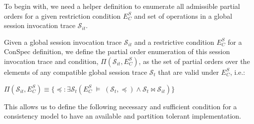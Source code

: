 \documentclass[conference]{IEEEtran}
\begin{document}
	
	
	
	To begin with, we need a helper definition to enumerate all admissible partial orders for a given restriction condition $E^S_C$ and set of operations in a global session invocation trace $\mathcal{S}_{it}$.
	
	\begin{definition} \label{def:allpos}
		Given a global session invocation trace $\mathcal{S}_{it}$ and a restrictive condition $E^S_C$
		for a ConSpec definition, we define the partial order enumeration
		of this session invocation trace and condition, $\Pi(\mathcal{S}_{it},E^S_C)$, as
		the set of partial orders over the elements of any compatible global session trace $\mathcal{S}_{t}$ that are valid
		under $E^S_C$, i.e.:
		
		
		$\Pi(\mathcal{S}_{it},E^S_C) \equiv  \{\preccurlyeq: \exists \mathcal{S}_{t} \left(  E^S_C\; \vDash \; \left( {\mathcal{S}_{t}}, \preccurlyeq \right) \wedge \mathcal{S}_{t}\bowtie \mathcal{S}_{it} \right) \}$
	\end{definition}
	
	This allows us to define the following necessary and sufficient condition
	for a consistency model to have an available and partition tolerant
	implementation.
	
\end{document}

